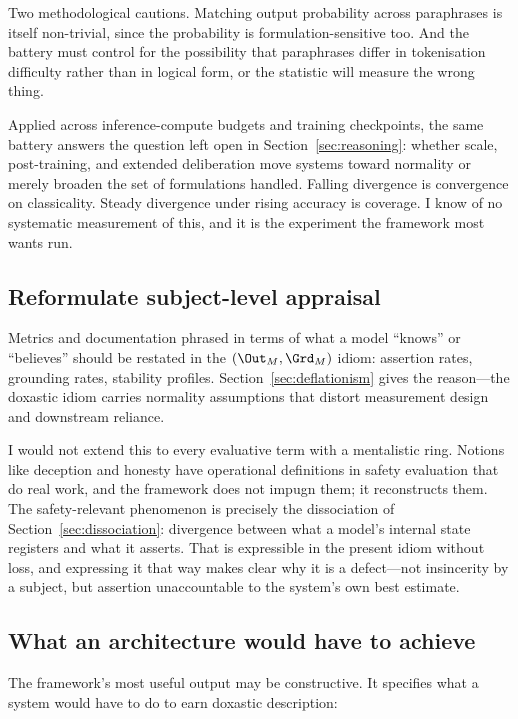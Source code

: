 Two methodological cautions. Matching output probability across paraphrases is
itself non-trivial, since the probability is formulation-sensitive too. And the
battery must control for the possibility that paraphrases differ in tokenisation
difficulty rather than in logical form, or the statistic will measure the wrong
thing.

Applied across inference-compute budgets and training checkpoints, the same
battery answers the question left open in Section~\ref{sec:reasoning}: whether
scale, post-training, and extended deliberation move systems toward normality or
merely broaden the set of formulations handled. Falling divergence is convergence
on classicality. Steady divergence under rising accuracy is coverage. I know of no
systematic measurement of this, and it is the experiment the framework most wants
run.

\subsection{Reformulate subject-level appraisal}
\label{sec:appraisal}

Metrics and documentation phrased in terms of what a model ``knows'' or
``believes'' should be restated in the $(\Out_M, \Grd_M)$ idiom: assertion rates,
grounding rates, stability profiles. Section~\ref{sec:deflationism} gives the
reason---the doxastic idiom carries normality assumptions that distort measurement
design and downstream reliance.

I would not extend this to every evaluative term with a mentalistic ring. Notions
like deception and honesty have operational definitions in safety evaluation that
do real work, and the framework does not impugn them; it reconstructs them. The
safety-relevant phenomenon is precisely the dissociation of
Section~\ref{sec:dissociation}: divergence between what a model's internal state
registers and what it asserts. That is expressible in the present idiom without
loss, and expressing it that way makes clear why it is a defect---not insincerity
by a subject, but assertion unaccountable to the system's own best estimate.

\subsection{What an architecture would have to achieve}
\label{sec:checklist}

The framework's most useful output may be constructive. It specifies what a
system would have to do to earn doxastic description:

